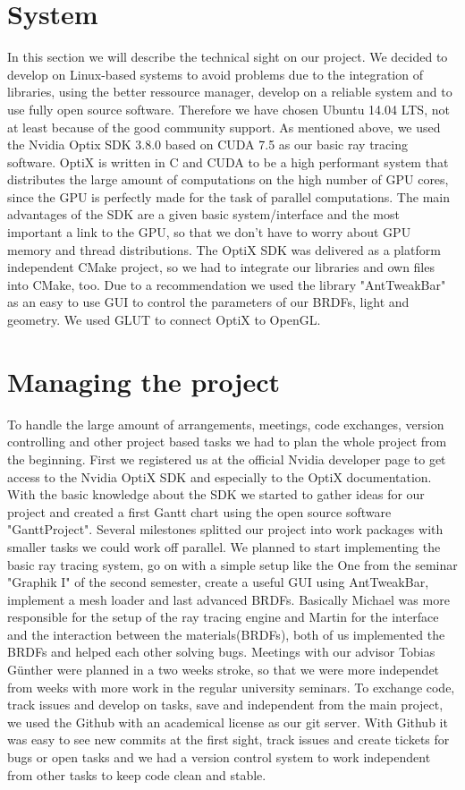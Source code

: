 \documentclass[11pt,a4paper]{article}
\begin{document}
\section{System}
\label{sec:System}
In this section we will describe the technical sight on our project. We decided to develop on Linux-based systems to avoid problems due to the integration of libraries, using the better ressource manager, develop on a reliable system and to use fully open source software. Therefore we have chosen Ubuntu 14.04 LTS, not at least because of the good community support. As mentioned above, we used the Nvidia Optix SDK 3.8.0 based on CUDA 7.5 as our basic ray tracing software. OptiX is written in C and CUDA to be a high performant system that distributes the large amount of computations on the high number of GPU cores, since the GPU is perfectly made for the task of parallel computations. The main advantages of the SDK are a given basic system/interface and the most important a link to the GPU, so that we don't have to worry about GPU memory and thread distributions. The OptiX SDK was delivered as a platform independent CMake project, so we had to integrate our libraries and own files into CMake, too. 
Due to a recommendation we used the library "AntTweakBar" as an easy to use GUI to control the parameters of our BRDFs, light and geometry. We used GLUT to connect OptiX to OpenGL.


\newpage
\section{Managing the project}
\label{sec:management}
To handle the large amount of arrangements, meetings, code exchanges, version controlling and other project based tasks we had to plan the whole project from the beginning. First we registered us at the official Nvidia developer page to get access to the Nvidia OptiX SDK and especially to the OptiX documentation. With the basic knowledge about the SDK we started to gather ideas for our project and created a first Gantt chart using the open source software "GanttProject". Several milestones splitted our project into work packages with smaller tasks we could work off parallel. We planned to start implementing the basic ray tracing system, go on with a simple setup like the One from the seminar "Graphik I" of the second semester, create a useful GUI using AntTweakBar, implement a mesh loader and last advanced BRDFs. Basically Michael was more responsible for the setup of the ray tracing engine and Martin for the interface and the interaction between the materials(BRDFs), both of us implemented the BRDFs and helped each other solving bugs. Meetings with our advisor Tobias Günther were planned in a two weeks stroke, so that we were more independet from weeks with more work in the regular university seminars. To exchange code, track issues and develop on tasks, save and independent from the main project, we used the Github with an academical license as our git server. With Github it was easy to see new commits at the first sight, track issues and create tickets for bugs or open tasks and we had a version control system to work independent from other tasks to keep code clean and stable.
\end{document}
